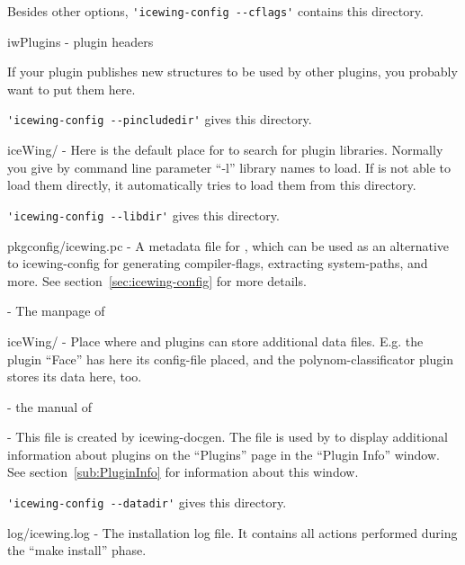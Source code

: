 \begin{description}
\begin{description}
    Besides other options, \verb|'icewing-config --cflags'| contains
    this directory.
  \item iwPlugins - plugin headers

    If your plugin publishes new structures to be used by other
    plugins, you probably want to put them here.

    \verb|'icewing-config --pincludedir'| gives this directory.
  \end{description}
\item [lib/]
  \begin{description}
  \item iceWing/ - Here is the default place for \icewing{} to
    search for plugin libraries. Normally you give \icewing{} by
    command line parameter ``-l'' library names to load. If
    \icewing{} is not able to load them directly, it automatically
    tries to load them from this directory.

    \verb|'icewing-config --libdir'| gives this directory.
  \item pkgconfig/icewing.pc - A metadata file for
    , which can be used as an alternative to
    icewing-config for generating compiler-flags, extracting
    system-paths, and more. See section~\ref{sec:icewing-config} for
    more details.
  \end{description}
\item [man/] - The manpage of \icewing{}
\item [share/]
  \begin{description}
  \item iceWing/ - Place where \icewing{} and plugins can store
    additional data files. E.g. the plugin ``Face'' has here its
    config-file placed, and the polynom-classificator plugin stores
    its data here, too.
    \begin{description}
    \item {} - the manual of \icewing{}
    \item {} - This file is created by
      icewing-docgen. The file is used by \icewing{} to display
      additional information about plugins on the ``Plugins'' page
      in the ``Plugin Info'' window. See
      section~\ref{sub:PluginInfo} for information about this
      window.
    \end{description}

    \verb|'icewing-config --datadir'| gives this directory.
  \item log/icewing.log - The installation log file. It contains all
    actions performed during the ``make install'' phase.
  \end{description}
\end{description} 

